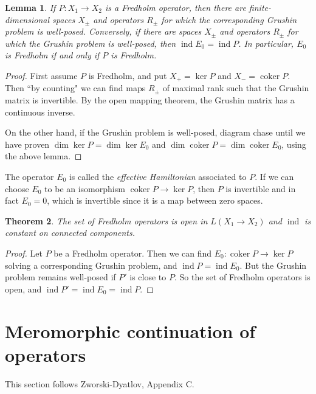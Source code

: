 \documentclass[12pt]{report}
\DeclareMathOperator*{\coker}{coker}
\newcommand{\ind}{\operatorname{ind}}
\newcommand{\dfn}[1]{\emph{#1}\index{#1}}
\newtheorem{theorem}{Theorem}[chapter]
\newtheorem{lemma}[theorem]{Lemma}
\theoremstyle{definition}
\begin{document}
\begin{lemma}
    If $P: X_1 \to X_2$ is a Fredholm operator, then there are finite-dimensional spaces $X_\pm$ and operators $R_\pm$ for which the corresponding Grushin problem is well-posed. Conversely, if there are spaces $X_\pm$ and operators $R_\pm$ for which the Grushin problem is well-posed, then $\ind E_0 = \ind P$. In particular, $E_0$ is Fredholm if and only if $P$ is Fredholm.
\end{lemma}
\begin{proof}
    First assume $P$ is Fredholm, and put $X_+ = \ker P$ and $X_- = \coker P$. Then ``by counting" we can find maps $R_\pm$ of maximal rank such that the Grushin matrix is invertible. By the open mapping theorem, the Grushin matrix has a continuous inverse.
    
    On the other hand, if the Grushin problem is well-posed, diagram chase until we have proven $\dim \ker P = \dim \ker E_0$ and $\dim \coker P= \dim \coker E_0$, using the above lemma.
\end{proof}
    The operator $E_0$ is called the \dfn{effective Hamiltonian} associated to $P$. If we can choose $E_0$ to be an isomorphism $\coker P \to \ker P$, then $P$ is invertible and in fact $E_0 = 0$, which is invertible since it is a map between zero spaces.
\begin{theorem}
The set of Fredholm operators is open in $L(X_1 \to X_2)$ and $\ind$ is constant on connected components.
\end{theorem}
\begin{proof}
    Let $P$ be a Fredholm operator. Then we can find $E_0: \coker P \to \ker P$ solving a corresponding Grushin problem, and $\ind P = \ind E_0$. But the Grushin problem remains well-posed if $P'$ is close to $P$. So the set of Fredholm operators is open, and $\ind P' = \ind E_0 = \ind P$.
\end{proof}
    
\section{Meromorphic continuation of operators}
This section follows Zworski-Dyatlov, Appendix C.
\end{document}
